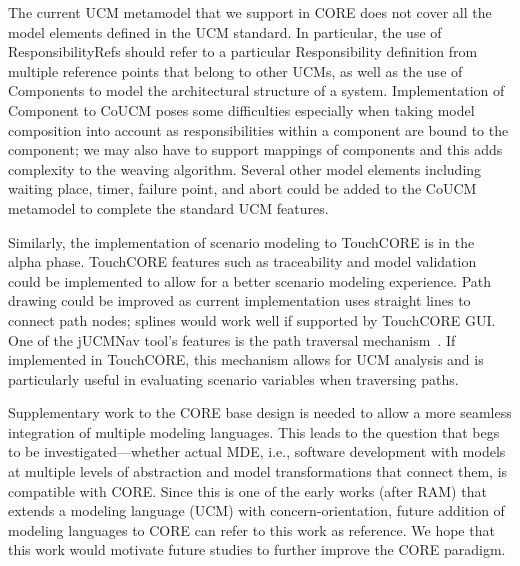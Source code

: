 The current UCM metamodel that we support in CORE does not cover all the model elements defined in the UCM standard. In particular, the use of {\cls ResponsibilityRef}s should refer to a particular {\cls Responsibility} definition from multiple reference points that belong to other UCMs, as well as the use of {\cls Component}s to model the architectural structure of a system. Implementation of {\cls Component} to CoUCM poses some difficulties especially when taking model composition into account as responsibilities within a component are bound to the component; we may also have to support mappings of components and this adds complexity to the weaving algorithm. Several other model elements including waiting place, timer, failure point, and abort could be added to the CoUCM metamodel to complete the standard UCM features.

Similarly, the implementation of scenario modeling to TouchCORE is in the alpha phase. TouchCORE features such as traceability and model validation could be implemented to allow for a better scenario modeling experience. Path drawing could be improved as current implementation uses straight lines to connect path nodes; splines would work well if supported by TouchCORE GUI. One of the jUCMNav tool's features is the path traversal mechanism~\cite{kealey2007enhanced2}. If implemented in TouchCORE, this mechanism allows for UCM analysis and is particularly useful in evaluating scenario variables when traversing paths.

Supplementary work to the CORE base design is needed to allow a more seamless integration of multiple modeling languages. This leads to the question that begs to be investigated---whether actual MDE, i.e., software development with models at multiple levels of abstraction and model transformations that connect them, is compatible with CORE. Since this is one of the early works (after RAM) that extends a modeling language (UCM) with concern-orientation, future addition of modeling languages to CORE can refer to this work as reference. We hope that this work would motivate future studies to further improve the CORE paradigm.
